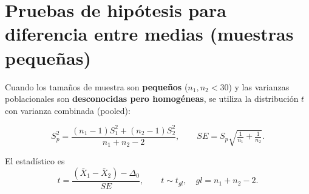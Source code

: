 
\section{Pruebas de hipótesis para diferencia entre medias (muestras pequeñas)}

Cuando los tamaños de muestra son \textbf{pequeños} ($n_1, n_2 < 30$) y las varianzas poblacionales son \textbf{desconocidas pero homogéneas}, se utiliza la distribución $t$ con varianza combinada (pooled):

\[
S_p^2 = \frac{(n_1-1)S_1^2 + (n_2-1)S_2^2}{n_1+n_2-2},
\qquad
SE = S_p \sqrt{\tfrac{1}{n_1} + \tfrac{1}{n_2}}.
\]

El estadístico es
\[
t = \frac{(\bar{X}_1 - \bar{X}_2)-\Delta_0}{SE},
\qquad t \sim t_{gl}, \quad gl=n_1+n_2-2.
\]

